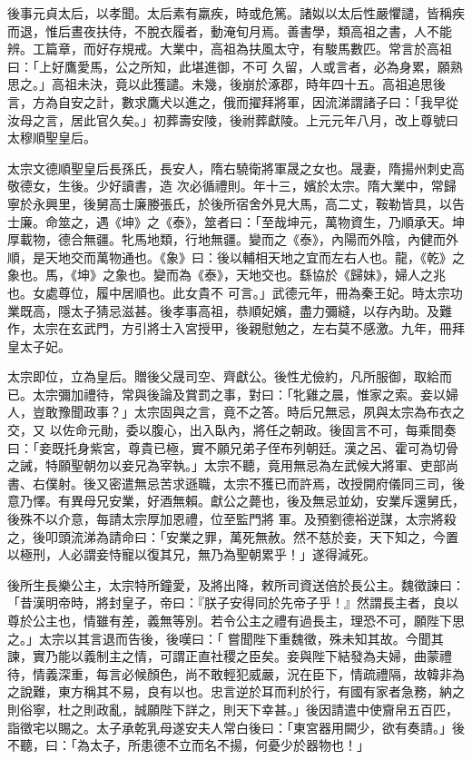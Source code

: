 \begin{pinyinscope}
 後事元貞太后，以孝聞。太后素有羸疾，時或危篤。諸姒以太后性嚴懼譴，皆稱疾而退，惟后晝夜扶侍，不脫衣履者，動淹旬月焉。善書學，類高祖之書，人不能辨。工篇章，而好存規戒。大業中，高祖為扶風太守，有駿馬數匹。常言於高祖曰：「上好鷹愛馬，公之所知，此堪進御，不可
 久留，人或言者，必為身累，願熟思之。」高祖未決，竟以此獲譴。未幾，後崩於涿郡，時年四十五。高祖追思後言，方為自安之計，數求鷹犬以進之，俄而擢拜將軍，因流涕謂諸子曰：「我早從汝母之言，居此官久矣。」初葬壽安陵，後祔葬獻陵。上元元年八月，改上尊號曰太穆順聖皇后。



 太宗文德順聖皇后長孫氏，長安人，隋右驍衛將軍晟之女也。晟妻，隋揚州刺史高敬德女，生後。少好讀書，造
 次必循禮則。年十三，嬪於太宗。隋大業中，常歸寧於永興里，後舅高士廉媵張氏，於後所宿舍外見大馬，高二丈，鞍勒皆具，以告士廉。命筮之，遇《坤》之《泰》，筮者曰：「至哉坤元，萬物資生，乃順承天。坤厚載物，德合無疆。牝馬地類，行地無疆。變而之《泰》，內陽而外陰，內健而外順，是天地交而萬物通也。《象》曰：後以輔相天地之宜而左右人也。龍，《乾》之象也。馬，《坤》之象也。變而為《泰》，天地交也。繇協於《歸妹》，婦人之兆也。女處尊位，履中居順也。此女貴不
 可言。」武德元年，冊為秦王妃。時太宗功業既高，隱太子猜忌滋甚。後孝事高祖，恭順妃嬪，盡力彌縫，以存內助。及難作，太宗在玄武門，方引將士入宮授甲，後親慰勉之，左右莫不感激。九年，冊拜皇太子妃。



 太宗即位，立為皇后。贈後父晟司空、齊獻公。後性尤儉約，凡所服御，取給而已。太宗彌加禮待，常與後論及賞罰之事，對曰：「牝雞之晨，惟家之索。妾以婦人，豈敢豫聞政事？」太宗固與之言，竟不之答。時后兄無忌，夙與太宗為布衣之交，又
 以佐命元勛，委以腹心，出入臥內，將任之朝政。後固言不可，每乘間奏曰：「妾既托身紫宮，尊貴已極，實不願兄弟子侄布列朝廷。漢之呂、霍可為切骨之誡，特願聖朝勿以妾兄為宰執。」太宗不聽，竟用無忌為左武候大將軍、吏部尚書、右僕射。後又密遣無忌苦求遜職，太宗不獲已而許焉，改授開府儀同三司，後意乃懌。有異母兄安業，好酒無賴。獻公之薨也，後及無忌並幼，安業斥還舅氏，後殊不以介意，每請太宗厚加恩禮，位至監門將
 軍。及預劉德裕逆謀，太宗將殺之，後叩頭流涕為請命曰：「安業之罪，萬死無赦。然不慈於妾，天下知之，今置以極刑，人必謂妾恃寵以復其兄，無乃為聖朝累乎！」遂得減死。



 後所生長樂公主，太宗特所鐘愛，及將出降，敕所司資送倍於長公主。魏徵諫曰：「昔漢明帝時，將封皇子，帝曰：『朕子安得同於先帝子乎！』然謂長主者，良以尊於公主也，情雖有差，義無等別。若令公主之禮有過長主，理恐不可，願陛下思之。」太宗以其言退而告後，後嘆曰：「
 嘗聞陛下重魏徵，殊未知其故。今聞其諫，實乃能以義制主之情，可謂正直社稷之臣矣。妾與陛下結發為夫婦，曲蒙禮待，情義深重，每言必候顏色，尚不敢輕犯威嚴，況在臣下，情疏禮隔，故韓非為之說難，東方稱其不易，良有以也。忠言逆於耳而利於行，有國有家者急務，納之則俗寧，杜之則政亂，誠願陛下詳之，則天下幸甚。」後因請遣中使齎帛五百匹，詣徵宅以賜之。太子承乾乳母遂安夫人常白後曰：「東宮器用闕少，欲有奏請。」後
 不聽，曰：「為太子，所患德不立而名不揚，何憂少於器物也！」




\end{pinyinscope}

